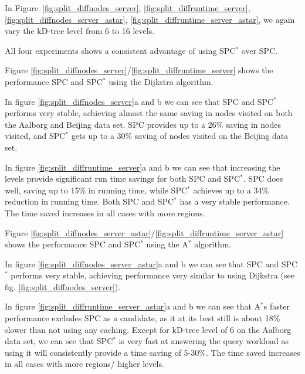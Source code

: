 %
%
{\color{red}
In Figure~\ref{fig:split_diffnodes_server}, \ref{fig:split_diffruntime_server}, \ref{fig:split_diffnodes_server_astar}, \ref{fig:split_diffruntime_server_astar}, we again vary the kD-tree level from 6 to 16 levels. 

All four experiments shows a consistent advantage of using SPC$^*$ over SPC. 


Figure \ref{fig:split_diffnodes_server}/\ref{fig:split_diffruntime_server} shows the performance SPC and SPC$^*$ using the Dijkstra \spath algorithm.

In figure \ref{fig:split_diffnodes_server}a and b we can see that SPC and SPC$^*$ performs very stable, achieving almost the same saving in nodes visited on both the Aalborg and Beijing data set. SPC provides up to a 26\% saving in nodes visited, and SPC$^*$ gets up to a 30\% saving of nodes visited on the Beijing data set.

In figure \ref{fig:split_diffruntime_server}a and b we can see that increasing the levels provide significant run time savings for both SPC and SPC$^*$.
SPC does well, saving up to 15\% in running time, while SPC$^*$ achieves up to a 34\% reduction in running time. Both SPC and SPC$^*$ has a very stable performance. The time saved increases in all cases with more regions.


Figure \ref{fig:split_diffnodes_server_astar}/\ref{fig:split_diffruntime_server_astar} shows the performance SPC and SPC$^*$ using the A$^*$ \spath algorithm.

In figure \ref{fig:split_diffnodes_server_astar}a and b we can see that SPC and SPC$^*$ performs very stable, achieving performance very similar to using Dijkstra (see fig. \ref{fig:split_diffnodes_server}).


In figure \ref{fig:split_diffruntime_server_astar}a and b we can see that A$^*$s faster performance excludes SPC as a candidate, as it at its best still is about 18\% slower than not using any caching. Except for kD-tree level of 6 on the Aalborg data set, we can see that SPC$^*$ is very fast at answering the query workload as using it will consistently provide a time saving of 5-30\%. The time saved increases in all cases with more regions/ higher levels.

}



